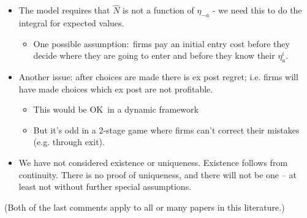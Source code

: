 \begin{frame}%


\begin{itemize}
\item The model requires that $\hat{N}$ is not a function of $\eta _{-a}$ -
we need this to do the integral for expected values.

\begin{itemize}
\item One possible assumption:\ firms pay an initial entry cost before they
decide where they are going to enter and before they know their $\eta
_{a}^{i}$.
\end{itemize}

\item Another issue: after choices are made there is ex post regret; i.e.
firms will have made choices which ex post are not profitable.

\begin{itemize}
\item This would be OK\ in a dynamic framework

\item But it's odd in a 2-stage game where firms can't correct their
mistakes (e.g. through exit).
\end{itemize}

\item We have not considered existence or uniqueness. Existence follows from
continuity. There is no proof of uniqueness, and there will not be one -- at
least not without further special assumptions.
\end{itemize}

(Both of the last comments apply to all or many papers in this literature.)

\end{frame}%

